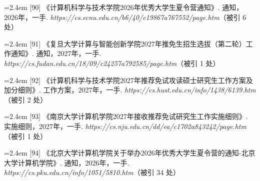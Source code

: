 {\nopagebreak\vspace{1pt}
\noindent\hangindent=2.4em \label{src:S0108}{\color{cAccent}[90]} 《计算机科学与技术学院2026年优秀大学生夏令营通知》. 通知，2026年，一手. \textit{https://cs.ecnu.edu.cn/b6/40/c19867a767552/page.htm}（被引 6 处）\par
\vspace{0.6pt}
\vspace{3.5pt}\par
\nopagebreak\vspace{1pt}
\noindent\hangindent=2.4em \label{src:S0109}{\color{cAccent}[91]} 《复旦大学计算与智能创新学院2027年推免生招生选拔（第二轮）工作通知》. 通知，2027年，一手. \textit{https://cs.fudan.edu.cn/18/09/c24257a792585/page.htm}（被引 1 处）\par
\vspace{0.6pt}
\vspace{3.5pt}\par
\nopagebreak\vspace{1pt}
\noindent\hangindent=2.4em \label{src:S0110}{\color{cAccent}[92]} 《计算机科学与技术学院2027年推荐免试攻读硕士研究生工作方案及加分细则》. 工作方案，2027年，一手. \textit{https://cs.hust.edu.cn/info/1438/6139.htm}（被引 2 处）\par
\vspace{0.6pt}
\vspace{3.5pt}\par
\nopagebreak\vspace{1pt}
\noindent\hangindent=2.4em \label{src:S0111}{\color{cAccent}[93]} 《南京大学计算机学院2027年接收推荐免试研究生工作实施细则》. 实施细则，2027年，一手. \textit{https://cs.nju.edu.cn/dd/ea/c1702a843242/page.htm}（被引 1 处）\par
\vspace{0.6pt}
\vspace{3.5pt}\par
\nopagebreak\vspace{1pt}
\noindent\hangindent=2.4em \label{src:S0114}{\color{cAccent}[94]} 《北京大学计算机学院关于举办2026年优秀大学生夏令营的通知-北京大学计算机学院》. 通知，2026年，一手. \textit{https://cs.pku.edu.cn/info/1051/5810.htm}（被引 34 处）\par
\vspace{0.6pt}
\vspace{3.5pt}\par
}
